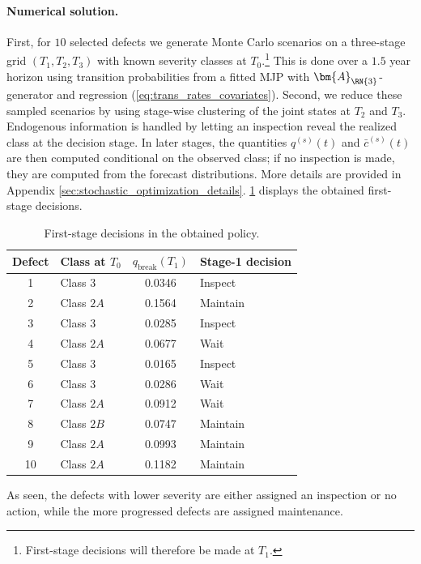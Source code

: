 \paragraph{Numerical solution.}
First, for $10$ selected defects we generate Monte Carlo scenarios on a three-stage grid $(T_1,T_2,T_3)$ with known severity classes at $T_0$.\footnote{First-stage decisions will therefore be made at $T_1$.}
This is done over a $1.5$ year horizon using transition probabilities from a fitted MJP with $\bm{A}_{\RN{3}}$-generator and regression (\cref{eq:trans_rates_covariates}). 
Second, we reduce these sampled scenarios by using stage-wise clustering of the joint states at $T_2$ and $T_3$.
Endogenous information is handled by letting an inspection reveal the realized class at the decision stage. In later stages, the quantities $q^{(s)}(t)$ and $\bar c^{(s)}(t)$ are then computed conditional on the observed class; if no inspection is made, they are computed from the forecast distributions. More details are provided in Appendix \ref{sec:stochastic_optimization_details}.
\cref{tab:decisions} displays the obtained first-stage decisions.
\begin{table}[htb!]
\centering
\caption{First-stage decisions in the obtained policy.} \label{tab:decisions}
\begin{tabular}{clcl}
\toprule
Defect & Class at $T_0$ & \(q_{\mathrm{break}}(T_1)\) & Stage-1 decision \\
\midrule
1 & Class $3$ & 0.0346 & Inspect \\
2 & Class $2A$ & 0.1564 & Maintain \\
3 & Class $3$ & 0.0285 & Inspect \\
4 & Class $2A$ & 0.0677 & Wait \\
5 &Class $3$ & 0.0165 & Inspect \\
6 & Class $3$ & 0.0286 & Wait \\
7 & Class $2A$ & 0.0912 & Wait \\
8 & Class $2B$ & 0.0747 & Maintain \\
9 & Class $2A$ & 0.0993 & Maintain \\
10 & Class $2A$ & 0.1182 & Maintain \\
\bottomrule
\end{tabular}
\end{table}
As seen, the defects with lower severity are either assigned an inspection or no action, while the more progressed defects are assigned maintenance.


